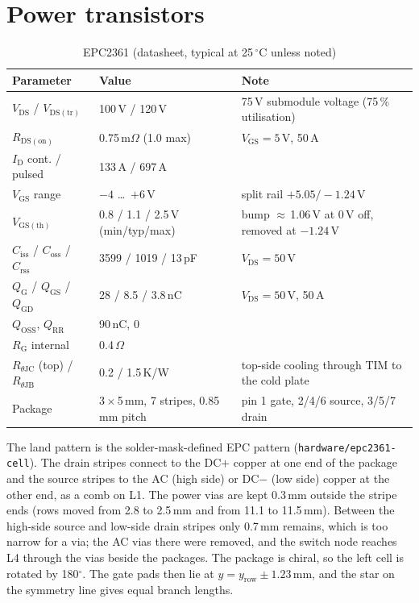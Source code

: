\documentclass[10pt,a4paper]{article}
\begin{document}
\section{Power transistors}
\begin{table}[H]
\centering\small
\caption{EPC2361 (datasheet, typical at 25\,$^\circ$C unless noted)}
\label{tab:fet}
\begin{tabular}{@{}lll@{}}
\toprule
Parameter & Value & Note \\
\midrule
$V_\mathrm{DS}$ / $V_\mathrm{DS(tr)}$ & 100\,V / 120\,V & 75\,V submodule voltage (75\,\% utilisation) \\
$R_\mathrm{DS(on)}$ & 0.75\,m$\Omega$ (1.0 max) & $V_\mathrm{GS}=5$\,V, 50\,A \\
$I_\mathrm{D}$ cont. / pulsed & 133\,A / 697\,A & \\
$V_\mathrm{GS}$ range & $-4$ \dots\ $+6$\,V & split rail $+5.05/-1.24$\,V \\
$V_\mathrm{GS(th)}$ & 0.8 / 1.1 / 2.5\,V (min/typ/max) & bump $\approx$\,1.06\,V at 0\,V off, removed at $-1.24$\,V \\
$C_\mathrm{iss}$ / $C_\mathrm{oss}$ / $C_\mathrm{rss}$ & 3599 / 1019 / 13\,pF & $V_\mathrm{DS}=50$\,V \\
$Q_\mathrm{G}$ / $Q_\mathrm{GS}$ / $Q_\mathrm{GD}$ & 28 / 8.5 / 3.8\,nC & $V_\mathrm{DS}=50$\,V, 50\,A \\
$Q_\mathrm{OSS}$, $Q_\mathrm{RR}$ & 90\,nC, 0 & \\
$R_\mathrm{G}$ internal & 0.4\,$\Omega$ & \\
$R_{\theta\mathrm{JC}}$ (top) / $R_{\theta\mathrm{JB}}$ & 0.2 / 1.5\,K/W & top-side cooling through TIM to the cold plate \\
Package & 3\,$\times$\,5\,mm, 7 stripes, 0.85\,mm pitch & pin 1 gate, 2/4/6 source, 3/5/7 drain \\
\bottomrule
\end{tabular}
\end{table}

The land pattern is the solder-mask-defined EPC pattern (\texttt{hardware/epc2361-cell}). The drain stripes connect to the DC$+$ copper at one end of the package and the source stripes to the AC (high side) or DC$-$ (low side) copper at the other end, as a comb on L1. The power vias are kept 0.3\,mm outside the stripe ends (rows moved from 2.8 to 2.5\,mm and from 11.1 to 11.5\,mm). Between the high-side source and low-side drain stripes only 0.7\,mm remains, which is too narrow for a via; the AC vias there were removed, and the switch node reaches L4 through the vias beside the packages. The package is chiral, so the left cell is rotated by 180$^\circ$. The gate pads then lie at $y = y_\mathrm{row}\pm 1.23$\,mm, and the star on the symmetry line gives equal branch lengths.
\end{document}

